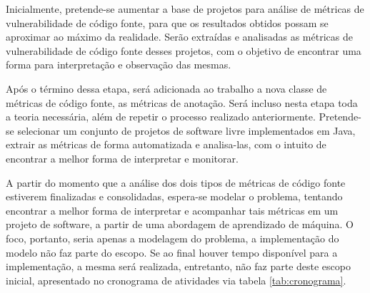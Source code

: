 Inicialmente, pretende-se aumentar a base de projetos para análise de métricas
de vulnerabilidade de código fonte, para que os resultados obtidos possam
se aproximar ao máximo da realidade. Serão extraídas e analisadas as métricas de
vulnerabilidade de código fonte desses projetos, com o objetivo de encontrar uma
forma para interpretação e observação das mesmas.

Após o término dessa etapa, será adicionada ao trabalho a nova classe de
métricas de código fonte, as métricas de anotação. Será incluso nesta
etapa toda a teoria necessária, além de repetir o processo realizado
anteriormente. Pretende-se selecionar um conjunto de projetos de software livre
implementados em Java, extrair as métricas de forma automatizada e analisa-las,
com o intuito de encontrar a melhor forma de interpretar e monitorar.

A partir do momento que a análise dos dois tipos de métricas de código fonte
estiverem finalizadas e consolidadas, espera-se modelar o problema, tentando
encontrar a melhor forma de  
interpretar e acompanhar tais métricas em um projeto de
software, a partir de uma abordagem de aprendizado de máquina. O foco, portanto, 
seria apenas a modelagem do problema, a implementação do modelo não
faz parte do escopo. Se ao final houver tempo disponível para a implementação, a
mesma será realizada, entretanto, não faz parte deste escopo inicial,
apresentado no cronograma de atividades via tabela \ref{tab:cronograma}.


